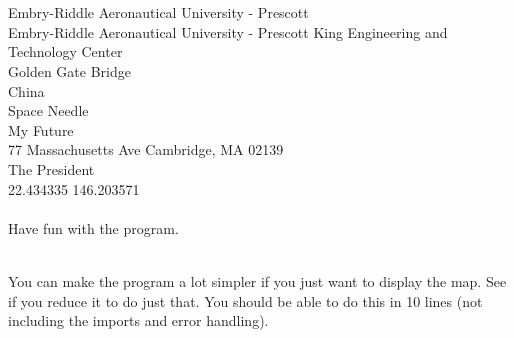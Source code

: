 \documentclass[11pt]{article}   %
\begin{document}
\\\\
Embry-Riddle Aeronautical University - Prescott\\
Embry-Riddle Aeronautical University - Prescott King Engineering and Technology Center\\
Golden Gate Bridge\\
China\\
Space Needle\\
My Future\\
77 Massachusetts Ave Cambridge, MA 02139\\
The President\\
22.434335 146.203571\\\\
Have fun with the program.

\\
You can make the program a lot simpler if you just want to display the map.  See if you reduce it to do just that.  You should be able to do this in 10 
lines (not including the imports and error handling).  
\end{document}
